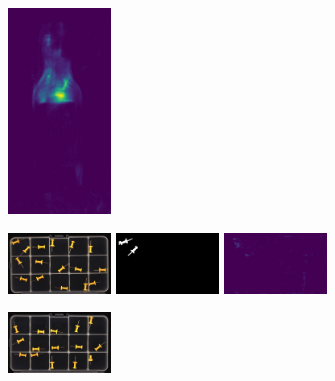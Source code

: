 \begin{figure}[H]
\begin{subfigure}[b]{\textwidth}
\begin{minipage}{0.45\textwidth}
            \includegraphics[width=0.3\textwidth]{figures/appendix/appendix_DRAEM/JB/280_mask.png}
        \end{minipage}
    \end{subfigure}
    \hfill
    \begin{subfigure}[b]{\textwidth}
        \centering
        \begin{minipage}{0.45\textwidth}
            \centering
            \includegraphics[width=0.3\textwidth]{figures/appendix/appendix_DRAEM/PP/l010.png}
            \includegraphics[width=0.3\textwidth]{figures/appendix/appendix_DRAEM/PP/10_m.png}
            \includegraphics[width=0.3\textwidth]{figures/appendix/appendix_DRAEM/PP/logical10.png}
        \end{minipage}
        \begin{minipage}{0.45\textwidth}
            \centering
            \includegraphics[width=0.3\textwidth]{figures/appendix/appendix_DRAEM/PP/s010.png}

\end{minipage}
\end{subfigure}
\end{figure}
